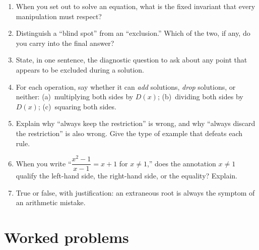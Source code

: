 \documentclass{essay}
\begin{document}
\begin{enumerate}[resume]

  \item When you set out to solve an equation, what is the fixed invariant that every
    manipulation must respect?

  \item Distinguish a ``blind spot'' from an ``exclusion.'' Which of the two, if any, do you
    carry into the final answer?

  \item State, in one sentence, the diagnostic question to ask about any point that appears to
    be excluded during a solution.

  \item For each operation, say whether it can \emph{add} solutions, \emph{drop} solutions, or
    neither: (a)~multiplying both sides by $D(x)$; (b)~dividing both sides by $D(x)$;
    (c)~squaring both sides.

  \item Explain why ``always keep the restriction'' is wrong, and why ``always discard the
    restriction'' is also wrong. Give the type of example that defeats each rule.

  \item When you write ``$\dfrac{x^2-1}{x-1} = x+1$ for $x \neq 1$,'' does the annotation
    $x \neq 1$ qualify the left-hand side, the right-hand side, or the equality? Explain.

  \item True or false, with justification: an extraneous root is always the symptom of an
    arithmetic mistake.

\end{enumerate}

\section{Worked problems}
\end{document}
